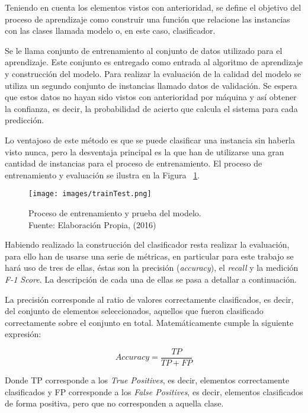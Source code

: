 Teniendo en cuenta los elementos vistos con anterioridad, se define el objetivo del proceso de aprendizaje como construir una función que relacione las instancias con las clases llamada modelo o, en este caso, clasificador.

Se le llama conjunto de entrenamiento al conjunto de datos utilizado para el aprendizaje. Este conjunto es entregado como entrada al algoritmo de aprendizaje y construcción del modelo. Para realizar la evaluación de la calidad del modelo se utiliza un segundo conjunto de instancias llamado datos de validación. Se espera que estos datos no hayan sido vistos con anterioridad por máquina y así obtener la confianza, es decir, la probabilidad de acierto que calcula el sistema para cada predicción.

Lo ventajoso de este método es que se puede clasificar una instancia sin haberla visto nunca, pero la desventaja principal es la que han de utilizarse una gran cantidad de instancias para el proceso de entrenamiento. El proceso de entrenamiento y evaluación se ilustra en la Figura ~\ref{fig:entrenamientoEvaluacion}.

\begin{figure}[H]
	\centering
	\captionsetup{justification=centering}
	\texttt{[image: images/trainTest.png]}
	\caption[Proceso de entrenamiento y prueba del modelo.]{Proceso de entrenamiento y prueba del modelo.\\Fuente: Elaboración Propia, (2016)}
	\label{fig:entrenamientoEvaluacion}
\end{figure}

Habiendo realizado la construcción del clasificador resta realizar la evaluación, para ello han de usarse una serie de métricas, en particular para este trabajo se hará uso de tres de ellas, éstas son la precisión (\textit{accuracy}), el \textit{recall} y la medición \textit{F-1 Score}. La descripción de cada una de ellas se pasa a detallar a continuación.

La precisión corresponde al ratio de valores correctamente clasificados, es decir, del conjunto de elementos seleccionados, aquellos que fueron clasificado correctamente sobre el conjunto en total. Matemáticamente cumple la siguiente expresión:

\[
	Accuracy = \frac{TP}{TP+FP}
\]

Donde TP corresponde a los \textit{True Positives}, es decir, elementos correctamente clasificados y FP corresponde a los \textit{False Positives}, es decir, elementos clasificados de forma positiva, pero que no corresponden a aquella clase.

